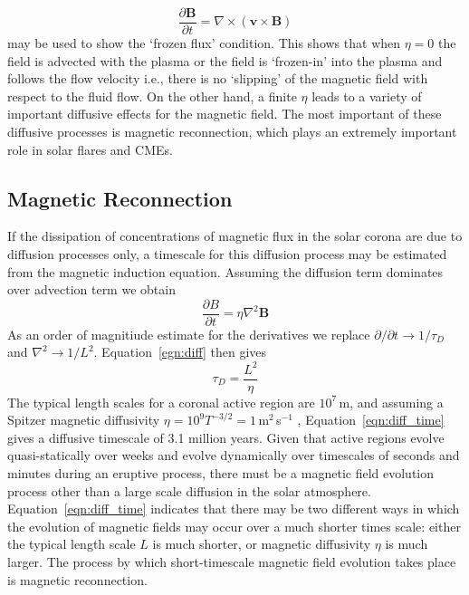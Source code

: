\begin{equation}
\frac{\partial \mathbf{B}}{\partial t} = \nabla \times(\mathbf{v}\times \mathbf{B})
\end{equation}
may be used to show the \textquoteleft frozen flux' condition. This shows that when $\eta = 0$ the field is advected with the plasma or the field is \textquoteleft frozen-in' into the plasma and follows the flow velocity i.e., there is no `slipping' of the magnetic field with respect to the fluid flow.  On the other hand, a finite $\eta$ leads to a variety of important diffusive effects for the magnetic field. The most important of these diffusive processes is magnetic reconnection, which plays an extremely important role in solar flares and CMEs.



\subsection{Magnetic Reconnection}\label{sec:13}

If the dissipation of concentrations of magnetic flux in the solar corona are due to diffusion processes only, a timescale for this diffusion process may be estimated from the magnetic induction equation. Assuming the diffusion term dominates over advection term we obtain
\begin{equation}
\frac{\partial B}{\partial t} = \eta\nabla^2\mathbf{B}
\label{egn:diff}
\end{equation}
As an order of magnitiude estimate for the derivatives we replace $\partial/\partial t \rightarrow 1/\tau_D$ and $\nabla^2 \rightarrow 1/L^2$. Equation~\ref{egn:diff} then gives
\begin{equation}
\tau_D = \frac{L^2}{\eta}
\label{eqn:diff_time}
\end{equation}
The typical length scales for a coronal active region are $10^7$\,m, and assuming a Spitzer magnetic diffusivity $\eta = 10^9T^{-3/2} = 1$\,m$^2$\,s$^{-1}$ \citep{spitzer1962}, Equation~\ref{eqn:diff_time} gives a diffusive timescale of 3.1 million years.
Given that active regions evolve quasi-statically over weeks and evolve dynamically over timescales of seconds and minutes during an eruptive process, there must be a magnetic field evolution process other than a large scale diffusion in the solar atmosphere. Equation~\ref{eqn:diff_time} indicates that there may be two different ways in which the evolution of magnetic fields may occur over a much shorter times scale: either the typical length scale $L$ is much shorter, or magnetic diffusivity $\eta$ is much larger. The process by which short-timescale magnetic field evolution takes place is magnetic reconnection.

